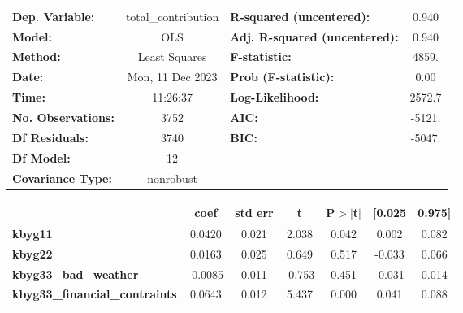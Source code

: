 \begin{center}
\begin{tabular}{lclc}
\toprule
\textbf{Dep. Variable:}                      & total\_contribution & \textbf{  R-squared (uncentered):}      &     0.940   \\
\textbf{Model:}                              &         OLS         & \textbf{  Adj. R-squared (uncentered):} &     0.940   \\
\textbf{Method:}                             &    Least Squares    & \textbf{  F-statistic:       }          &     4859.   \\
\textbf{Date:}                               &   Mon, 11 Dec 2023  & \textbf{  Prob (F-statistic):}          &     0.00    \\
\textbf{Time:}                               &       11:26:37      & \textbf{  Log-Likelihood:    }          &    2572.7   \\
\textbf{No. Observations:}                   &          3752       & \textbf{  AIC:               }          &    -5121.   \\
\textbf{Df Residuals:}                       &          3740       & \textbf{  BIC:               }          &    -5047.   \\
\textbf{Df Model:}                           &            12       & \textbf{                     }          &             \\
\textbf{Covariance Type:}                    &      nonrobust      & \textbf{                     }          &             \\
\bottomrule
\end{tabular}
\begin{tabular}{lcccccc}
                                             & \textbf{coef} & \textbf{std err} & \textbf{t} & \textbf{P$> |$t$|$} & \textbf{[0.025} & \textbf{0.975]}  \\
\midrule
\textbf{kbyg11}                              &       0.0420  &        0.021     &     2.038  &         0.042        &        0.002    &        0.082     \\
\textbf{kbyg22}                              &       0.0163  &        0.025     &     0.649  &         0.517        &       -0.033    &        0.066     \\
\textbf{kbyg33\_bad\_weather}                &      -0.0085  &        0.011     &    -0.753  &         0.451        &       -0.031    &        0.014     \\
\textbf{kbyg33\_financial\_contraints}       &       0.0643  &        0.012     &     5.437  &         0.000        &        0.041    &        0.088     \\

\end{tabular}
\end{center}
